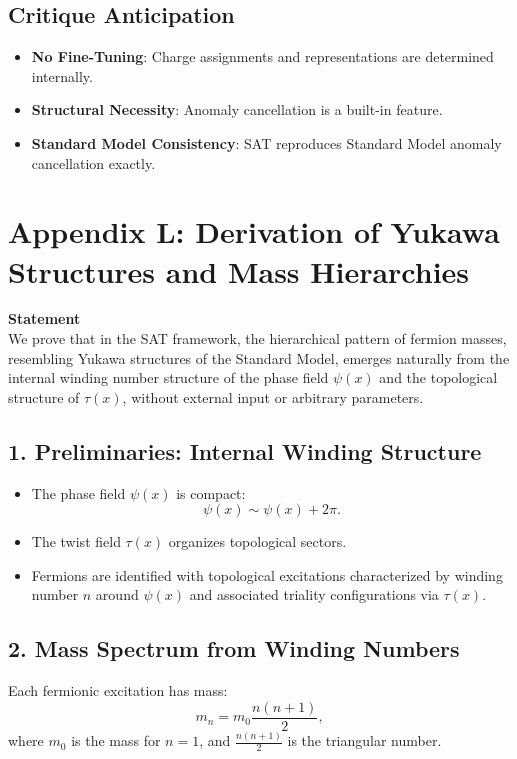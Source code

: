 \documentclass[12pt]{article}
\begin{document}
\subsection*{Critique Anticipation}
\begin{itemize}
    \item \textbf{No Fine-Tuning}: Charge assignments and representations are determined internally.
    \item \textbf{Structural Necessity}: Anomaly cancellation is a built-in feature.
    \item \textbf{Standard Model Consistency}: SAT reproduces Standard Model anomaly cancellation exactly.
\end{itemize}

\newpage
\section*{Appendix L: Derivation of Yukawa Structures and Mass Hierarchies}

\textbf{Statement} \\
We prove that in the SAT framework, the hierarchical pattern of fermion masses, resembling Yukawa structures of the Standard Model, emerges naturally from the internal winding number structure of the phase field \(\psi(x)\) and the topological structure of \(\tau(x)\), without external input or arbitrary parameters.

\subsection*{1. Preliminaries: Internal Winding Structure}
\begin{itemize}
    \item The phase field \(\psi(x)\) is compact:
    \[
    \psi(x) \sim \psi(x) + 2\pi.
    \]
    \item The twist field \(\tau(x)\) organizes topological sectors.
    \item Fermions are identified with topological excitations characterized by winding number \(n\) around \(\psi(x)\) and associated triality configurations via \(\tau(x)\).
\end{itemize}

\subsection*{2. Mass Spectrum from Winding Numbers}
Each fermionic excitation has mass:
\[
m_n = m_0 \frac{n(n+1)}{2},
\]
where \(m_0\) is the mass for \(n = 1\), and \(\frac{n(n+1)}{2}\) is the triangular number.
\end{document}
